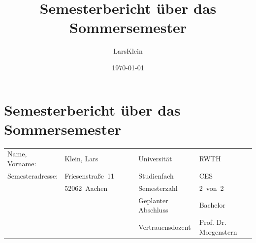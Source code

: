 \documentclass[12pt]{article}
\newcommand{\Semester}{Sommersemester}
\newcommand{\Datum}{\today}
\newcommand{\Semesteranzahl}{2}
\newcommand{\Gesamtsemesterzahl}{2}
\newcommand{\Abschluss}{Bachelor}
\newcommand{\Studienfach}{CES}
\newcommand{\University}{RWTH}
\newcommand{\Nachname}{Klein}
\newcommand{\Vorname}{Lars}
\newcommand{\Strasse}{Friesenstraße}
\newcommand{\Hausnummer}{11}
\newcommand{\PLZ}{52062}
\newcommand{\Ort}{Aachen}
\newcommand{\Vertrauensdozent}{Prof. Dr. Morgenstern}
\begin{document}
\title{Semesterbericht über das \Semester \Jahr}
\author{\Vorname \Nachname}
\date{\Datum}
\section*{Semesterbericht über das \Semester~\Jahr}
\begin{tabularx}{\textwidth}{@{}llllX}
Name, Vorname:   & \Nachname, \Vorname & Universität         & \University \\
Semesteradresse: &\Strasse~\Hausnummer & Studienfach         & \Studienfach \\
                 &\PLZ~\Ort~~~~~~~     & Semesterzahl        & \Semesteranzahl~von~\Gesamtsemesterzahl \\
                 &                     & Geplanter Abschluss & \Abschluss \\
                 &                     & Vertrauensdozent    & \Vertrauensdozent \\
\end{tabularx}
\end{document}
